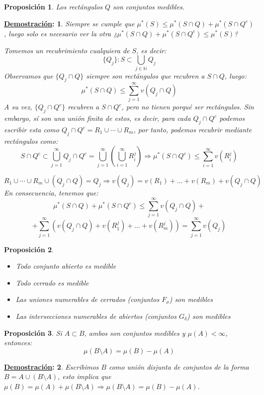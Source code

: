 \documentclass[10pt,a4paper,openright]{book}
\theoremstyle{break}
\newtheorem*{prop}{Proposición}
\newtheorem*{demo}{\underline{Demostración}:}
\begin{document}
\begin{prop}
Los rectángulos $Q$ son conjuntos medibles. 
\end{prop}
\begin{demo}
Siempre se cumple que $ \mu^*\left( S \right) \le \mu^*\left( S\cap Q \right) + \mu^*\left( S\cap Q^c \right)$, luego solo es necesario ver la otra ¿$ \mu^*\left( S\cap Q \right) + \mu^*\left( S\cap Q^c \right) \le \mu^*\left( S \right)$?

Tomemos un recubrimiento cualquiera de $S$, es decir:
$$\{Q_j\}: S \subset \bigcup_{j \in \mathbb{N}} Q_j$$
Observamos que $ \{Q_j \cap Q\} $ siempre son rectángulos que recubren a $S\cap Q$, luego:
$$\mu^*\left( S\cap Q \right) \le \sum_{j=1}^{\infty} v\left( Q_j \cap Q \right)$$
A su vez, $ \{Q_j \cap Q^c\}$ recubren a $S\cap Q^c$, pero no tienen porqué ser rectángulos. Sin embargo, sí son una unión finita de estos, es decir, para cada $Q_j \cap Q^c$ podemos escribir esta como $Q_j \cap Q^c = R_1 \cup \cdots \cup R_m$, por tanto, podemos recubrir mediante rectángulos como:
$$S \cap Q^c \subset \bigcup_{j=1}^\infty Q_j\cap Q^c = \bigcup_{j=1}^\infty \left(\bigcup_{i=1}^\infty  R_i^j \right)\Rightarrow \mu^*\left( S\cap Q^c \right) \le \sum_{i=1}^{\infty} v\left( R^j_i \right) $$

$$ R_1 \cup \cdots \cup R_m \cup \left( Q_j \cap Q \right) = Q_j \Rightarrow v\left( Q_j \right) = v\left( R_1 \right) +\ldots + v\left( R_m \right) + v\left( Q_j\cap Q \right) $$
En consecuencia, tenemos que:
$$\mu^*\left( S\cap Q \right) + \mu^*\left( S \cap Q^c \right) \le \sum_{j=1}^{\infty} v\left( Q_j \cap Q \right) + $$
$$+ \sum_{j=1}^{\infty} \left( v\left( Q_j\cap Q \right) + v\left( R_1^j \right) +\ldots + v\left( R_m^j \right) \right) = \sum_{j=1}^{\infty} v\left( Q_j \right)$$
\end{demo}

\begin{prop}
\begin{itemize}
\item Todo conjunto abierto es medible
\item Todo cerrado es medible
\item Las uniones numerables de cerrados (conjuntos $F_\sigma$) son medibles
\item Las intersecciones numerables de abiertos  (conjuntos $G_\delta$) son medibles
\end{itemize}
\end{prop}

\begin{prop}
Si $A\subset B$, ambos son conjuntos medibles y $\mu(A) < \infty$, entonces:
$$\mu(B\setminus A) = \mu(B) - \mu(A)$$
\end{prop}
\begin{demo}
Escribimos $B$ como unión disjunta de conjuntos de la forma $B=A\cup (B\setminus A)$, esto implica que $\mu(B) = \mu(A) + \mu(B\setminus A) \Rightarrow \mu(B\setminus A) =  \mu(B) - \mu(A)$.
\end{demo}
\end{document}
